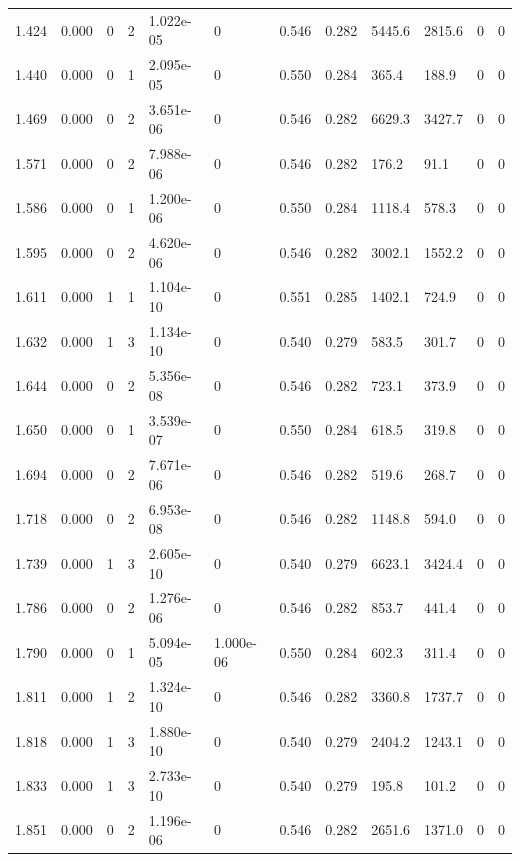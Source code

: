 \documentclass[preview]{standalone}
\begin{document}
{{{\begin{tabular}{L{1.2cm}C{1.2cm} C{0.3cm}C{0.5cm} C{1.4cm}C{1.4cm} C{1.4cm}C{1.4cm} C{1.6cm}C{1.6cm} C{1.6cm}C{1.6cm}}
  1.424  &  0.000  & 0     &  2 &  1.022e-05  & 0  &  0.546&   0.282& 5445.6 & 2815.6   &  0 & 0  \\ 
  1.440  &  0.000  & 0     &  1 &  2.095e-05  & 0  &  0.550&   0.284& 365.4 & 188.9   &  0 & 0  \\ 
  1.469  &  0.000  & 0     &  2 &  3.651e-06  & 0  &  0.546&   0.282& 6629.3 & 3427.7   &  0 & 0  \\ 
  1.571  &  0.000  & 0     &  2 &  7.988e-06  & 0  &  0.546&   0.282& 176.2 & 91.1   &  0 & 0  \\ 
  1.586  &  0.000  & 0     &  1 &  1.200e-06  & 0  &  0.550&   0.284& 1118.4 & 578.3   &  0 & 0  \\ 
  1.595  &  0.000  & 0     &  2 &  4.620e-06  & 0  &  0.546&   0.282& 3002.1 & 1552.2   &  0 & 0  \\ 
  1.611  &  0.000  & 1     &  1 &  1.104e-10  & 0  &  0.551&   0.285& 1402.1 & 724.9   &  0 & 0  \\ 
  1.632  &  0.000  & 1     &  3 &  1.134e-10  & 0  &  0.540&   0.279& 583.5 & 301.7   &  0 & 0  \\ 
  1.644  &  0.000  & 0     &  2 &  5.356e-08  & 0  &  0.546&   0.282& 723.1 & 373.9   &  0 & 0  \\ 
  1.650  &  0.000  & 0     &  1 &  3.539e-07  & 0  &  0.550&   0.284& 618.5 & 319.8   &  0 & 0  \\ 
  1.694  &  0.000  & 0     &  2 &  7.671e-06  & 0  &  0.546&   0.282& 519.6 & 268.7   &  0 & 0  \\ 
  1.718  &  0.000  & 0     &  2 &  6.953e-08  & 0  &  0.546&   0.282& 1148.8 & 594.0   &  0 & 0  \\ 
  1.739  &  0.000  & 1     &  3 &  2.605e-10  & 0  &  0.540&   0.279& 6623.1 & 3424.4   &  0 & 0  \\ 
  1.786  &  0.000  & 0     &  2 &  1.276e-06  & 0  &  0.546&   0.282& 853.7 & 441.4   &  0 & 0  \\ 
  1.790  &  0.000  & 0     &  1 &  5.094e-05  & 1.000e-06  &  0.550&   0.284& 602.3 & 311.4   &  0 & 0  \\ 
  1.811  &  0.000  & 1     &  2 &  1.324e-10  & 0  &  0.546&   0.282& 3360.8 & 1737.7   &  0 & 0  \\ 
  1.818  &  0.000  & 1     &  3 &  1.880e-10  & 0  &  0.540&   0.279& 2404.2 & 1243.1   &  0 & 0  \\ 
  1.833  &  0.000  & 1     &  3 &  2.733e-10  & 0  &  0.540&   0.279& 195.8 & 101.2   &  0 & 0  \\ 
  1.851  &  0.000  & 0     &  2 &  1.196e-06  & 0  &  0.546&   0.282& 2651.6 & 1371.0   &  0 & 0  \\ 

\end{tabular}}}}
\end{document}
